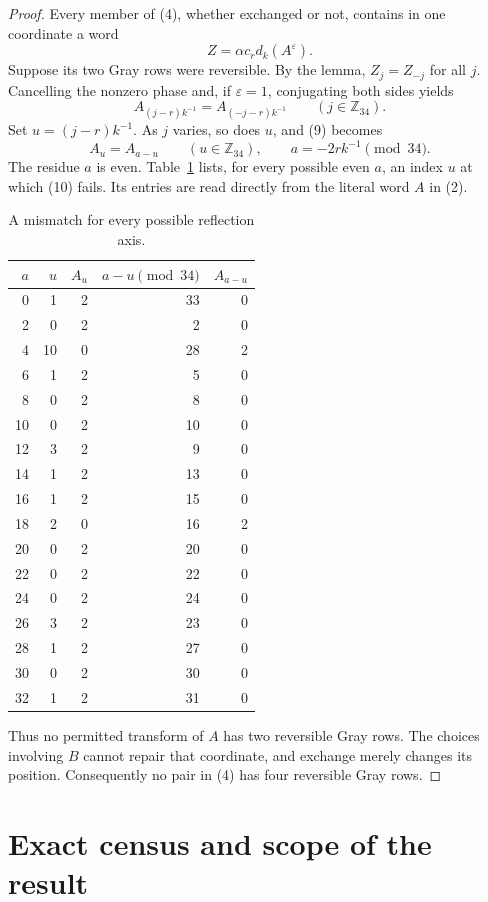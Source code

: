 \documentclass[11pt]{article}
\newcommand{\Z}{\mathbb Z}
\begin{document}
\begin{proof}
Every member of (4), whether exchanged or not, contains in one coordinate a
word
\[
 Z=\alpha c_r d_k(A^\varepsilon).
 \tag{8}
\]
Suppose its two Gray rows were reversible.  By the lemma, $Z_j=Z_{-j}$ for
all $j$.  Cancelling the nonzero phase and, if $\varepsilon=1$, conjugating
both sides yields
\[
 A_{(j-r)k^{-1}}=A_{(-j-r)k^{-1}}\qquad(j\in\Z_{34}).
 \tag{9}
\]
Set $u=(j-r)k^{-1}$.  As $j$ varies, so does $u$, and (9) becomes
\[
 A_u=A_{a-u}\qquad(u\in\Z_{34}),
 \qquad a=-2rk^{-1}\pmod {34}.
 \tag{10}
\]
The residue $a$ is even.  Table~\ref{tab:axes} lists, for every possible even
$a$, an index $u$ at which (10) fails.  Its entries are read directly from
the literal word $A$ in (2).

\begin{table}[ht]
\centering
\caption{A mismatch for every possible reflection axis.}
\label{tab:axes}
\begin{tabular}{rrrrr}
\toprule
$a$ & $u$ & $A_u$ & $a-u\pmod {34}$ & $A_{a-u}$\\
\midrule
 0& 1&2&33&0\\
 2& 0&2& 2&0\\
 4&10&0&28&2\\
 6& 1&2& 5&0\\
 8& 0&2& 8&0\\
10& 0&2&10&0\\
12& 3&2& 9&0\\
14& 1&2&13&0\\
16& 1&2&15&0\\
18& 2&0&16&2\\
20& 0&2&20&0\\
22& 0&2&22&0\\
24& 0&2&24&0\\
26& 3&2&23&0\\
28& 1&2&27&0\\
30& 0&2&30&0\\
32& 1&2&31&0\\
\bottomrule
\end{tabular}
\end{table}

Thus no permitted transform of $A$ has two reversible Gray rows.  The choices
involving $B$ cannot repair that coordinate, and exchange merely changes its
position.  Consequently no pair in (4) has four reversible Gray rows.
\end{proof}

\section{Exact census and scope of the result}
\end{document}
